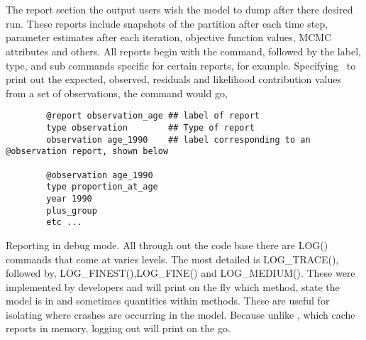 \section{\label{sec:report-section}}
The report section the output users wish the model to dump after there desired run. These reports include snapshots of the partition after each time step, parameter estimates after each iteration, objective function values, MCMC attributes and others. All reports begin with the  command, followed by the label, type, and sub commands specific for certain reports, for example. Specifying \CNAME\ to print out the expected, observed, residuals and likelihood contribution values from a set of observations, the command would go,

{\small{\begin{verbatim}
		@report observation_age ## label of report
		type observation		## Type of report
		observation age_1990	## label corresponding to an @observation report, shown below
		
		@observation age_1990
		type proportion_at_age
		year 1990
		plus_group
		etc ...
		\end{verbatim}}}



 Reporting in debug mode. All through out the code base there are LOG() commands that come at varies levels. The most detailed is LOG\_TRACE(), followed by, LOG\_FINEST(),LOG\_FINE() and LOG\_MEDIUM(). These were implemented by developers and will print on the fly which method, state the model is in and sometimes quantities within methods. These are useful for isolating where crashes are occurring in the model. Because unlike , which cache reports in memory, logging out will print on the go.

